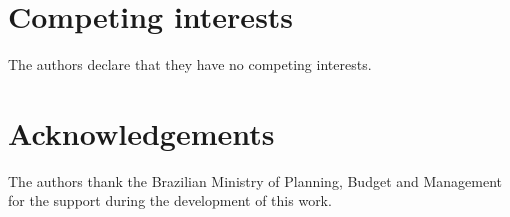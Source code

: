 \documentclass{bmcart}
\begin{document}
\begin{backmatter}

\section*{Competing interests}
  The authors declare that they have no competing interests.


\section*{Acknowledgements}
The authors thank the Brazilian Ministry of Planning, Budget and Management for the support during the development of this work.







\end{backmatter}
\end{document}
